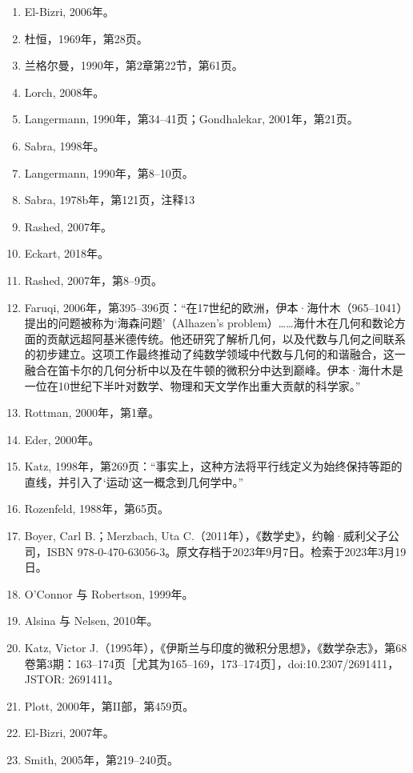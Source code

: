 \begin{enumerate}
\item El-Bizri, 2006年。
\item 杜恒，1969年，第28页。
\item 兰格尔曼，1990年，第2章第22节，第61页。
\item Lorch, 2008年。
\item Langermann, 1990年，第34–41页；Gondhalekar, 2001年，第21页。
\item Sabra, 1998年。
\item Langermann, 1990年，第8–10页。
\item Sabra, 1978b年，第121页，注释13
\item Rashed, 2007年。
\item Eckart, 2018年。
\item Rashed, 2007年，第8–9页。
\item Faruqi, 2006年，第395–396页：“在17世纪的欧洲，伊本·海什木（965–1041）提出的问题被称为‘海森问题’（Alhazen's problem）……海什木在几何和数论方面的贡献远超阿基米德传统。他还研究了解析几何，以及代数与几何之间联系的初步建立。这项工作最终推动了纯数学领域中代数与几何的和谐融合，这一融合在笛卡尔的几何分析中以及在牛顿的微积分中达到巅峰。伊本·海什木是一位在10世纪下半叶对数学、物理和天文学作出重大贡献的科学家。”
\item Rottman, 2000年，第1章。
\item Eder, 2000年。
\item Katz, 1998年，第269页：“事实上，这种方法将平行线定义为始终保持等距的直线，并引入了‘运动’这一概念到几何学中。”
\item Rozenfeld, 1988年，第65页。
\item Boyer, Carl B.；Merzbach, Uta C.（2011年），《数学史》，约翰·威利父子公司，ISBN 978-0-470-63056-3。原文存档于2023年9月7日。检索于2023年3月19日。
\item O'Connor 与 Robertson, 1999年。
\item Alsina 与 Nelsen, 2010年。
\item Katz, Victor J.（1995年），《伊斯兰与印度的微积分思想》，《数学杂志》，第68卷第3期：163–174页［尤其为165–169，173–174页］，doi:10.2307/2691411，JSTOR: 2691411。
\item Plott, 2000年，第II部，第459页。
\item El-Bizri, 2007年。
\item Smith, 2005年，第219–240页。

\end{enumerate}